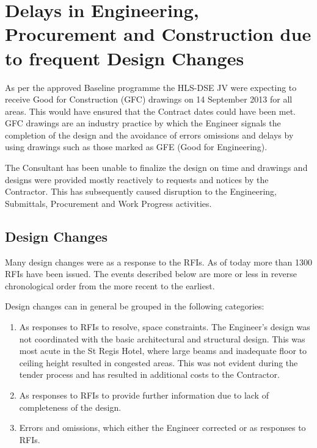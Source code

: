 

\chapter{Delays in Engineering, Procurement and Construction due to frequent  Design Changes}

As per the approved Baseline programme the HLS-DSE JV were expecting to receive Good for Construction (GFC) drawings on 14 September 2013 for all areas. This would have ensured that the Contract dates could have been met. GFC drawings are an industry practice by which the Engineer signals the completion of the design and the avoidance of errors omissions and delays by using drawings such as those marked as GFE (Good for Engineering). 

The Consultant has been unable to finalize the design on time and drawings and designs were provided mostly reactively to requests and notices by the Contractor. This has subsequently caused disruption to the \JV Engineering, Submittals, Procurement and Work Progress activities.

\section{Design Changes}

Many design changes were as a response to the \JV RFIs. As of today more than 1300 RFIs have been issued. The events described below are more or less in reverse chronological order from the more recent to the earliest.

Design changes can in general be grouped in the following categories:

\begin{enumerate}
\item As responses to RFIs to resolve, space constraints. The Engineer's design was not coordinated with the basic architectural and structural design. This was most acute in the St Regis Hotel, where large beams and inadequate floor to ceiling height resulted in congested  areas. This was not evident during the tender process and has resulted in additional costs to the Contractor.

\item As responses to RFIs to provide further information due to lack of completeness of the design.

\item Errors and omissions, which either the Engineer corrected or as responses to RFIs.
\end{enumerate}

